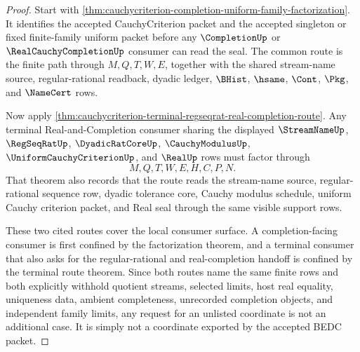 \begin{proof}
Start with \autoref{thm:cauchycriterion-completion-uniform-family-factorization}. It identifies the accepted CauchyCriterion packet and the accepted singleton or fixed finite-family uniform packet before any $\CompletionUp$ or $\RealCauchyCompletionUp$ consumer can read the seal. The common route is the finite path through $M,Q,T,W,E$, together with the shared stream-name source, regular-rational readback, dyadic ledger, $\BHist$, $\hsame$, $\Cont$, $\Pkg$, and $\NameCert$ rows.

Now apply \autoref{thm:cauchycriterion-terminal-regseqrat-real-completion-route}. Any terminal Real-and-Completion consumer sharing the displayed $\StreamNameUp$, $\RegSeqRatUp$, $\DyadicRatCoreUp$, $\CauchyModulusUp$, $\UniformCauchyCriterionUp$, and $\RealUp$ rows must factor through
$$
M,Q,T,W,E,H,C,P,N.
$$
That theorem also records that the route reads the stream-name source, regular-rational sequence row, dyadic tolerance core, Cauchy modulus schedule, uniform Cauchy criterion packet, and Real seal through the same visible support rows.

These two cited routes cover the local consumer surface. A completion-facing consumer is first confined by the factorization theorem, and a terminal consumer that also asks for the regular-rational and real-completion handoff is confined by the terminal route theorem. Since both routes name the same finite rows and both explicitly withhold quotient streams, selected limits, host real equality, uniqueness data, ambient completeness, unrecorded completion objects, and independent family limits, any request for an unlisted coordinate is not an additional case. It is simply not a coordinate exported by the accepted BEDC packet.
\end{proof}
